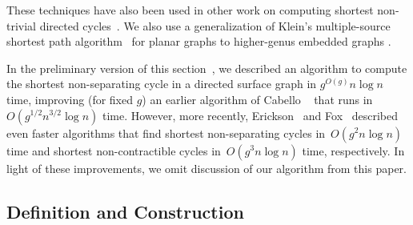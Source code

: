 \documentclass[11pt,twoside]{article}
\def\Z{\mathbb{Z}}
\begin{document}
 These techniques have also been used in other work on computing shortest non-trivial directed cycles~\cite{e-sncds-11,f-sntcd-13}.
We also use a generalization of Klein's multiple-source shortest path algorithm~\cite{k-msspp-05} for planar graphs to higher-genus embedded graphs \cite{cce-msspe-13}.

In the preliminary version of this section~\cite{en-mcsnc-11}, we described an algorithm to compute the shortest non-separating cycle in a directed surface graph in $g^{O(g)} n \log n$ time, improving (for fixed $g$) an earlier algorithm of Cabello \etal~\cite{ccl-fsncd-10} that runs in $O(g^{1/2}n^{3/2}\log n)$ time.  However, more recently, Erickson~\cite{e-sncds-11} and Fox~\cite{f-sntcd-13} described even faster algorithms that find shortest non-separating cycles in~$O(g^2 n \log n)$ time and shortest non-contractible cycles in~$O(g^3 n \log n)$ time, respectively.  In light of these improvements, we omit discussion of our algorithm from this paper.

%
%
%
%
%
%
%
%

\subsection{Definition and Construction}
\label{sec:homcover_cover}
\end{document}
